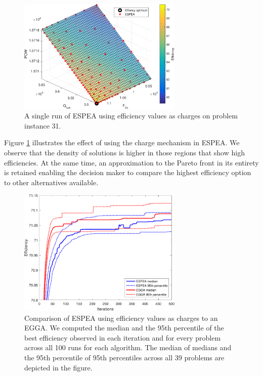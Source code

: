 \begin{figure}
\centering
\includegraphics[width=0.7\textwidth]{figures/espeacharge_cropped.pdf}
\caption{A single run of ESPEA using efficiency values as charges on problem instance 31.}
\label{fig:espea}
\end{figure}

Figure \ref{fig:espea} illustrates the effect of using the charge mechanism in ESPEA. We observe that the density of solutions is higher in those regions that show high efficiencies. At the same time, an approximation to the Pareto front in its entirety is retained enabling the decision maker to compare the highest efficiency option to other alternatives available.

\begin{figure}
\centering
\includegraphics[width=0.7\textwidth]{figures/efficiency_cropped.pdf}
\caption{Comparison of ESPEA using efficiency values as charges to an EGGA. We computed the median and the 95th percentile of the best efficiency observed in each iteration and for every problem across all 100 runs for each algorithm. The median of medians and the 95th percentile of 95th percentiles across all 39 problems are depicted in the figure.}
\label{fig:efficiency}
\end{figure}

